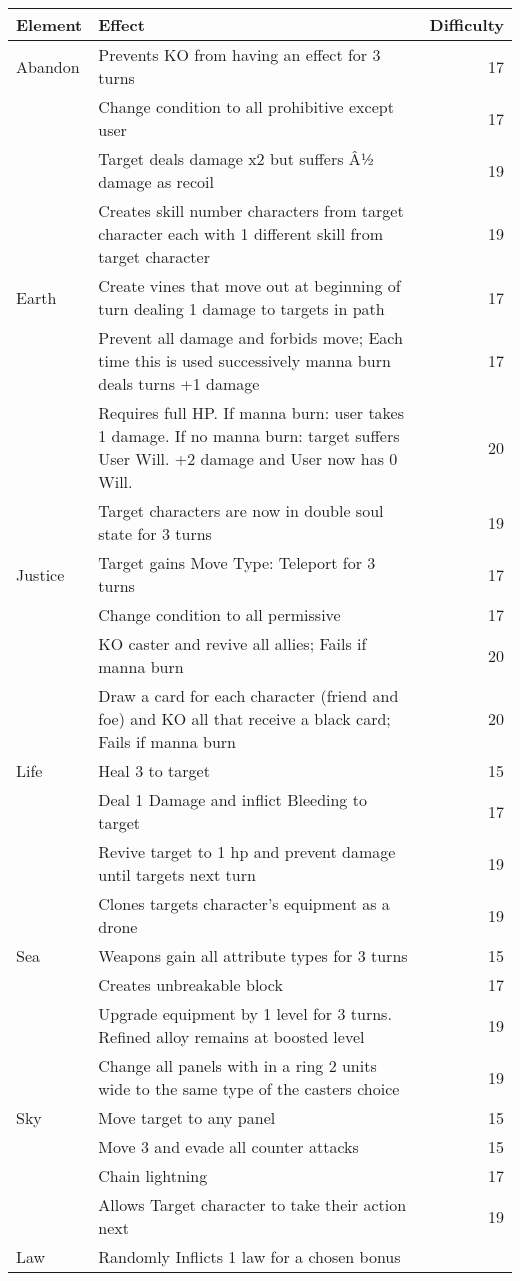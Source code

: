 \begin{tabularx}{\textwidth}{l X r}

\hline
Element & Effect & Difficulty \\
\hline
Abandon & Prevents KO from having an effect for 3 turns & 17 \\
  &Change condition to all prohibitive except user & 17\\
  & Target deals damage x2 but suffers Â½ damage as recoil & 19\\
  &Creates skill number characters from target character each with 1 different skill from target character & 19 \\
Earth & Create vines that move out at beginning of turn dealing 1 damage to targets in path & 17 \\
  & Prevent all damage and forbids move; Each time this is used successively manna burn deals turns +1 damage & 17 \\
  & Requires full HP.  If manna burn: user takes 1 damage. If no manna burn: target suffers User Will. +2 damage and User now has 0 Will. & 20\\
  & Target characters are now in double soul state for 3 turns & 19 \\
Justice & Target gains Move Type: Teleport for 3 turns & 17\\
  &Change condition to all permissive & 17\\
  &KO caster and revive all allies; Fails if manna burn& 20\\
  &Draw a card for each character (friend and foe) and KO all that receive a black card; Fails if manna burn & 20\\
Life & Heal 3 to target& 15\\
  & Deal 1 Damage and inflict Bleeding to target & 17\\
  &Revive target to 1 hp and prevent damage until targets next turn & 19\\
  &Clones targets character's equipment as a drone & 19\\
Sea & Weapons gain all attribute types for 3 turns & 15\\
  & Creates unbreakable block & 17 \\
  & Upgrade equipment by 1 level for 3 turns.  Refined alloy remains at boosted level & 19\\
  & Change all panels with in a ring 2 units wide to the same type of the casters choice & 19\\
Sky & Move target to any panel & 15\\
  & Move 3 and evade all counter attacks & 15\\
  & Chain lightning & 17\\
  & Allows Target character to take their action next & 19\\
Law & Randomly Inflicts 1 law for a chosen bonus & \\

\end{tabularx}
